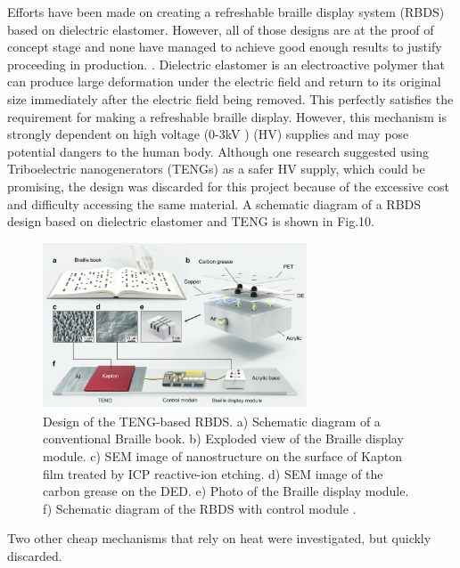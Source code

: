 Efforts have been made on creating a refreshable braille display system (RBDS) based on dielectric elastomer. However, all of those designs are at the proof of concept stage and none have managed to achieve good enough results to justify proceeding in production. \cite{qu_refreshable_2021}.
Dielectric elastomer is an electroactive polymer that can produce large deformation under the electric field and return to its original size immediately after the electric field being removed.
This perfectly satisfies the requirement for making a refreshable braille display. 
However, this mechanism is strongly dependent on high voltage (0-3kV \cite{qu_refreshable_2021}) (HV) supplies and may pose potential dangers to the human body.
Although one research suggested using Triboelectric nanogenerators (TENGs) as a safer HV supply, which could be promising, the design was discarded for this project because of the excessive cost and difficulty accessing the same material. 
A schematic diagram of a RBDS design based on dielectric elastomer and TENG is shown in Fig.10.

\begin{figure}[h]\centering
    \includegraphics[width=0.7\textwidth]{figures/teng.png}
    \caption[Dielectric elastomer Braille display]{Design of the TENG-based RBDS. a) Schematic diagram of a conventional Braille book. b) Exploded view of the Braille display module. c) SEM image of nanostructure on the surface of Kapton film treated by ICP reactive-ion etching. d) SEM image of the carbon grease on the DED. e) Photo of the Braille display module. f) Schematic diagram of the RBDS with control module \cite{qu_refreshable_2021}.}
    \label{fig:teng.png}
\end{figure}

Two other cheap mechanisms that rely on heat were investigated, but quickly discarded.


